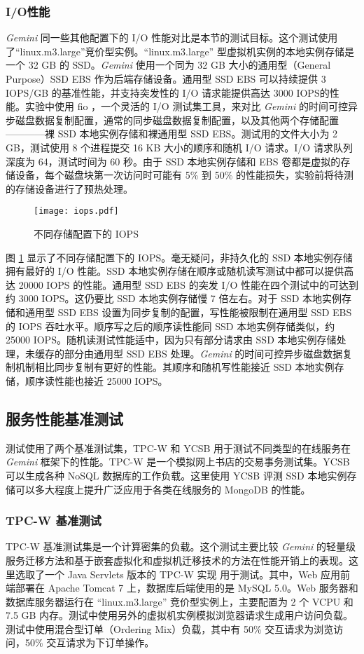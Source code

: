 \subsubsection{I/O性能}
\emph{Gemini} 同一些其他配置下的 I/O 性能对比是本节的测试目标。这个测试使用了``linux.m3.large''竞价型实例。``linux.m3.large'' 型虚拟机实例的本地实例存储是一个 32 GB 的 SSD。\emph{Gemini} 使用一个同为 32 GB 大小的通用型（General Purpose）SSD EBS 作为后端存储设备。通用型 SSD EBS 可以持续提供 3 IOPS/GB 的基准性能，并支持突发性的 I/O 请求能提供高达 3000 IOPS的性能。实验中使用 fio \cite{FIO:2014}，一个灵活的 I/O 测试集工具，来对比 \emph{Gemini} 的时间可控异步磁盘数据复制配置，通常的同步磁盘数据复制配置，以及其他两个存储配置————裸 SSD 本地实例存储和裸通用型 SSD EBS。测试用的文件大小为 2 GB，测试使用 8 个进程提交 16 KB 大小的顺序和随机 I/O 请求。I/O 请求队列深度为 64，测试时间为 60 秒。由于 SSD 本地实例存储和 EBS 卷都是虚拟的存储设备，每个磁盘块第一次访问时可能有 5\% 到 50\% 的性能损失，实验前将待测的存储设备进行了预热处理。
\begin{figure}[]
  \centering
  \texttt{[image: iops.pdf]}
  \caption{不同存储配置下的 IOPS}
  \label{figure:iops}
\end{figure}

图 \ref{figure:iops} 显示了不同存储配置下的 IOPS。毫无疑问，非持久化的 SSD 本地实例存储拥有最好的 I/O 性能。SSD 本地实例存储在顺序或随机读写测试中都可以提供高达 20000 IOPS 的性能。通用型 SSD EBS 的突发 I/O 性能在四个测试中的可达到约 3000 IOPS。这仍要比 SSD 本地实例存储慢 7 倍左右。对于 SSD 本地实例存储和通用型 SSD EBS 设置为同步复制的配置，写性能被限制在通用型 SSD EBS 的 IOPS 吞吐水平。顺序写之后的顺序读性能同 SSD 本地实例存储类似，约 25000 IOPS。随机读测试性能适中，因为只有部分请求由 SSD 本地实例存储处理，未缓存的部分由通用型 SSD EBS 处理。\emph{Gemini} 的时间可控异步磁盘数据复制机制相比同步复制有更好的性能。其顺序和随机写性能接近 SSD 本地实例存储，顺序读性能也接近 25000 IOPS。

\subsection{服务性能基准测试}
测试使用了两个基准测试集，TPC-W 和 YCSB 用于测试不同类型的在线服务在 \emph{Gemini} 框架下的性能。TPC-W 是一个模拟网上书店的交易事务测试集。YCSB 可以生成各种 NoSQL 数据库的工作负载。这里使用 YCSB 评测 SSD 本地实例存储可以多大程度上提升广泛应用于各类在线服务的 MongoDB 的性能。

\subsubsection{TPC-W 基准测试}
TPC-W 基准测试集是一个计算密集的负载。这个测试主要比较 \emph{Gemini} 的轻量级服务迁移方法和基于嵌套虚拟化和虚拟机迁移技术的方法在性能开销上的表现。这里选取了一个 Java Servlets 版本的 TPC-W 实现 \cite{JAVATPCW:2014} 用于测试。其中，Web 应用前端部署在 Apache Tomcat 7 上，数据库后端使用的是 MySQL 5.0。Web 服务器和数据库服务器运行在 ``linux.m3.large'' 竞价型实例上，主要配置为 2 个 VCPU 和 7.5 GB 内存。测试中使用另外的虚拟机实例模拟浏览器请求生成用户访问负载。测试中使用混合型订单（Ordering Mix）负载，其中有 50\% 交互请求为浏览访问，50\% 交互请求为下订单操作。

